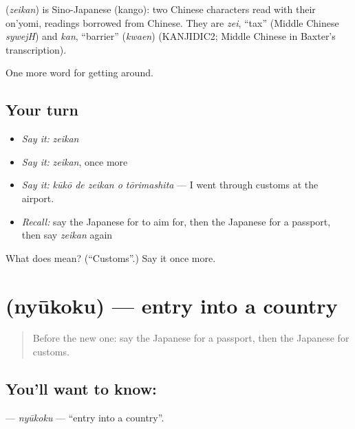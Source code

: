\begin{cousinweb}
\textbf{} (\emph{zeikan}) is Sino-Japanese (kango): two Chinese characters read with their on'yomi, readings borrowed from Chinese. They are \emph{zei}, \textquotedblleft{}tax\textquotedblright{} (Middle Chinese \emph{sywejH}) and \emph{kan}, \textquotedblleft{}barrier\textquotedblright{} (\emph{kwaen}) (KANJIDIC2; Middle Chinese in Baxter's transcription).
\end{cousinweb}

\begin{grammarlens}[title={What you've built}]
One more word for getting around.
\end{grammarlens}

\subsection*{Your turn}
\begin{itemize}
\raggedright
  \item \emph{Say it:} \emph{zeikan}
  \item \emph{Say it:} \emph{zeikan}, once more
  \item \emph{Say it:} \emph{kūkō de zeikan o tōrimashita} — I went through customs at the airport.
  \item \emph{Recall:} say the Japanese for to aim for, then the Japanese for a passport, then say \emph{zeikan} again
\end{itemize}

\begin{tcolorbox}[breakable,colback=teal!4,colframe=teal!35!black,title={Before you move on}]
What does  mean? (\textquotedblleft{}Customs\textquotedblright{}.) Say it once more.
\end{tcolorbox}
\section[\texorpdfstring{\ja{にゅうこく} (nyūkoku)}{にゅうこく (nyūkoku)}]{ (nyūkoku) — entry into a country}

\label{lesson:JA-C386-nyuukoku}



\begin{quote}
Before the new one: say the Japanese for a passport, then the Japanese for customs.
\end{quote}

\subsection*{You'll want to know: }
\textbf{} — \emph{nyūkoku} — \textquotedblleft{}entry into a country\textquotedblright{}.

